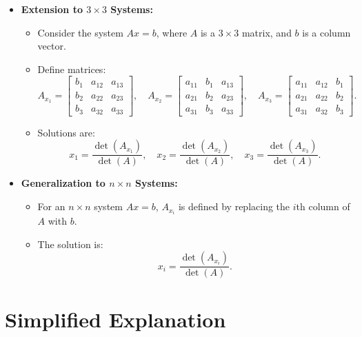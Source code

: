 \documentclass{article}
\begin{document}
\begin{itemize}
  \item \textbf{Extension to $3 \times 3$ Systems:}
    \begin{itemize}
      \item Consider the system $Ax = b$, where $A$ is a $3 \times 3$ matrix, and $b$ is a column vector.
      \item Define matrices:
        \[
          A_{x_1} =
          \begin{bmatrix}
            b_1 & a_{12} & a_{13} \\
            b_2 & a_{22} & a_{23} \\
            b_3 & a_{32} & a_{33}
          \end{bmatrix},
          \quad
          A_{x_2} =
          \begin{bmatrix}
            a_{11} & b_1 & a_{13} \\
            a_{21} & b_2 & a_{23} \\
            a_{31} & b_3 & a_{33}
          \end{bmatrix},
          \quad
          A_{x_3} =
          \begin{bmatrix}
            a_{11} & a_{12} & b_1 \\
            a_{21} & a_{22} & b_2 \\
            a_{31} & a_{32} & b_3
          \end{bmatrix}.
        \]
      \item Solutions are:
        \[
          x_1 = \frac{\det(A_{x_1})}{\det(A)}, \quad x_2 = \frac{\det(A_{x_2})}{\det(A)}, \quad x_3 = \frac{\det(A_{x_3})}{\det(A)}.
        \]
    \end{itemize}

  \item \textbf{Generalization to $n \times n$ Systems:}
    \begin{itemize}
      \item For an $n \times n$ system $Ax = b$, $A_{x_i}$ is defined by replacing the $i$th column of $A$ with $b$.
      \item The solution is:
        \[
          x_i = \frac{\det(A_{x_i})}{\det(A)}.
        \]
    \end{itemize}
\end{itemize}

\section*{Simplified Explanation}
\end{document}
